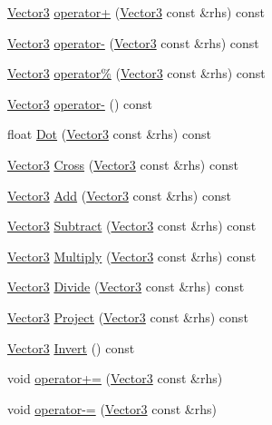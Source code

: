 \begin{DoxyCompactItemize}
\item 
\hyperlink{structVector3}{Vector3} \hyperlink{structVector3_a55a40520eb3849eea483dac47abe2e88}{operator+} (\hyperlink{structVector3}{Vector3} const \&rhs) const 
\item 
\hyperlink{structVector3}{Vector3} \hyperlink{structVector3_a9ecddd81a219696c61745e19d9f0565b}{operator-\/} (\hyperlink{structVector3}{Vector3} const \&rhs) const 
\item 
\hyperlink{structVector3}{Vector3} \hyperlink{structVector3_ab819ba41eadb569b0f7dc49c72c9e5d4}{operator\%} (\hyperlink{structVector3}{Vector3} const \&rhs) const 
\item 
\hyperlink{structVector3}{Vector3} \hyperlink{structVector3_a72a36c71164f1532d24ec49c3d7056fc}{operator-\/} () const 
\item 
float \hyperlink{structVector3_aca6d4e8ab07642759bc15f5bfac8c76f}{Dot} (\hyperlink{structVector3}{Vector3} const \&rhs) const 
\item 
\hyperlink{structVector3}{Vector3} \hyperlink{structVector3_a0dc14f281baa737a711c45d7e52ed5e3}{Cross} (\hyperlink{structVector3}{Vector3} const \&rhs) const 
\item 
\hyperlink{structVector3}{Vector3} \hyperlink{structVector3_ac2f4bd0b553b3581779a594a1200d17d}{Add} (\hyperlink{structVector3}{Vector3} const \&rhs) const 
\item 
\hyperlink{structVector3}{Vector3} \hyperlink{structVector3_add7e687fa8bb5e3ee41927873c7831ba}{Subtract} (\hyperlink{structVector3}{Vector3} const \&rhs) const 
\item 
\hyperlink{structVector3}{Vector3} \hyperlink{structVector3_aaa88d1ef629b5394a7b68aa11af3b998}{Multiply} (\hyperlink{structVector3}{Vector3} const \&rhs) const 
\item 
\hyperlink{structVector3}{Vector3} \hyperlink{structVector3_a5aeef5450c7bc5d6fa2d0fb34c5b28c6}{Divide} (\hyperlink{structVector3}{Vector3} const \&rhs) const 
\item 
\hyperlink{structVector3}{Vector3} \hyperlink{structVector3_ae864696dbfce80824b5f0648f602fddc}{Project} (\hyperlink{structVector3}{Vector3} const \&rhs) const 
\item 
\hyperlink{structVector3}{Vector3} \hyperlink{structVector3_aad6620b5301e8214d19423e141cc1f13}{Invert} () const 
\item 
void \hyperlink{structVector3_a9e4c90e4cc8f2b9dc18480c0ea2df149}{operator+=} (\hyperlink{structVector3}{Vector3} const \&rhs)
\item 
void \hyperlink{structVector3_afaf0587b85243dc9f544cf0574e4ed60}{operator-\/=} (\hyperlink{structVector3}{Vector3} const \&rhs)

\end{DoxyCompactItemize}

